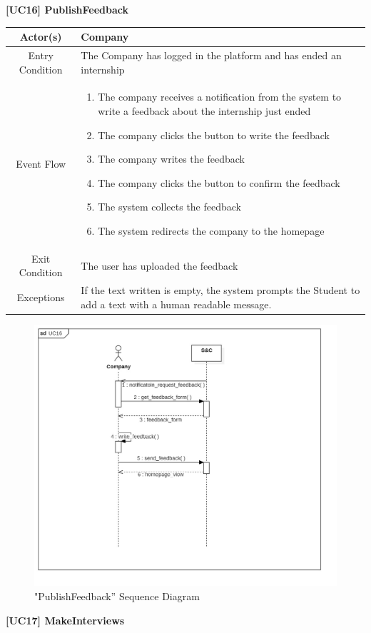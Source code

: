 \documentclass{article}
\begin{document}
\vspace{1cm}
\textbf{[UC16] PublishFeedback}

\begin{table}[H]
    \centering
    \begin{tabular}{|c|p{10cm}|}
    \hline
        Actor(s)  & Company\\ 
    \hline
        Entry Condition &  
        The Company has logged in the platform and has ended an internship\\
    \hline
        Event Flow &
        \begin{enumerate}
            \item The company receives a notification from the system to write a feedback about the internship just ended
            \item The company clicks the button to write the feedback
            \item The company writes the feedback
            \item The company clicks the button to confirm the feedback
            \item The system collects the feedback 
            \item The system redirects the company to the homepage
        \end{enumerate}
        \\
    \hline
        Exit Condition & The user has uploaded the feedback\\
    \hline
        Exceptions &  If the text written is empty, the system prompts the Student to add a text with a human readable message.\\
    \hline
    \end{tabular}
    \label{tab:my_label}
\end{table}
\begin{figure}[H]
    \centering
    \includegraphics[width=1\linewidth]{sequenceDiagrams/UC16.jpg}
    \caption{"PublishFeedback” Sequence Diagram}
    \label{fig:enter-label}
\end{figure}
\vspace{1cm}
\textbf{[UC17] MakeInterviews}
\end{document}
